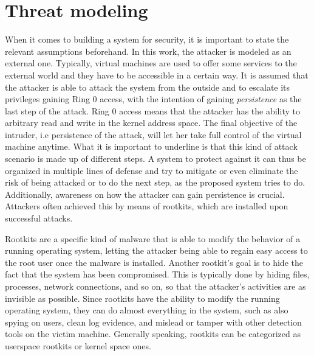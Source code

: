 \section{Threat modeling}
When it comes to building a system for security, it is important to state the relevant assumptions beforehand. In this work, the attacker is modeled as an external one. Typically, virtual machines are used to offer some services to the external world and they have to be accessible in a certain way. It is assumed that the attacker is able to attack the system from the outside and to escalate its privileges gaining Ring 0 access, with the intention of gaining \emph{persistence} as the last step of the attack. Ring 0 access means that the attacker has the ability to arbitrary read and write in the kernel address space. The final objective of the intruder, i.e persistence of the attack, will let her take full control of the virtual machine anytime. What it is important to underline is that this kind of attack scenario is made up of different steps. A system to protect against it can thus be organized in multiple lines of defense and try to mitigate or even eliminate the risk of being attacked or to do the next step, as the proposed system tries to do. Additionally, awareness on how the attacker can gain persistence is crucial. Attackers often achieved this by means of rootkits, which are installed upon successful attacks.
\par Rootkits are a specific kind of malware that is able to modify the behavior of a running operating system, letting the attacker being able to regain easy access to the root user once the malware is installed. Another rootkit's goal is to hide the fact that the system has been compromised. This is typically done by hiding files, processes, network connections, and so on, so that the attacker's activities are as invisible as possible. Since rootkits have the ability to modify the running operating system, they can do almost everything in the system, such as also spying on users, clean log evidence, and mislead or tamper with other detection tools on the victim machine. Generally speaking, rootkits can be categorized as userspace rootkits or kernel space ones. 
